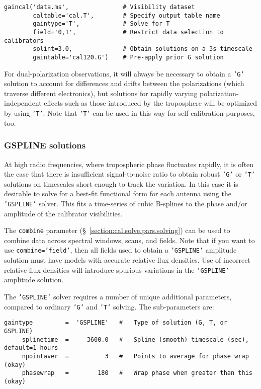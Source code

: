 \small
\begin{verbatim}
gaincal('data.ms',               # Visibility dataset
        caltable='cal.T',        # Specify output table name
        gaintype='T',            # Solve for T
        field='0,1',             # Restrict data selection to calibrators
        solint=3.0,              # Obtain solutions on a 3s timescale
        gaintable='cal120.G')    # Pre-apply prior G solution
\end{verbatim}
\normalsize

For dual-polarization observations, it will always be necessary to
obtain a {\tt 'G'} solution to account for differences and drifts between
the polarizations (which traverse different electronics), but
solutions for rapidly varying polarization-independent effects such as
those introduced by the troposphere will be optimized by using {\tt 'T'}.
Note that {\tt 'T'} can be used in this way for self-calibration purposes,
too.

\subsubsection{GSPLINE solutions}
\label{section:cal.solve.gain.gspline}

At high radio frequencies, where tropospheric phase fluctuates
rapidly, it is often the case that there is insufficient
signal-to-noise ratio to obtain robust {\tt 'G'} or {\tt 'T'}
solutions on timescales short enough to track the 
variation.  In this case it is desirable to solve for a best-fit
functional form for each antenna using the {\tt 'GSPLINE'} solver.  
This fits a time-series of cubic B-splines to the phase and/or
amplitude of the calibrator visibilities.  

The {\tt combine} parameter (\S~\ref{section:cal.solve.pars.solving}) 
can be used to combine data across spectral windows, scans, and
fields.  Note that if you want to use {\tt combine='field'},
then all fields used to obtain a {\tt 'GSPLINE'} amplitude solution must have
models with accurate relative flux densities.  Use of incorrect
relative flux densities will introduce spurious variations in the
{\tt 'GSPLINE'} amplitude solution.

The {\tt 'GSPLINE'} solver requires a number of unique additional parameters,
compared to ordinary {\tt 'G'} and {\tt 'T'} solving.  The sub-parameters are:
\small
\begin{verbatim}
gaintype         =  'GSPLINE'   #   Type of solution (G, T, or GSPLINE)
     splinetime  =     3600.0   #   Spline (smooth) timescale (sec), default=1 hours
     npointaver  =          3   #   Points to average for phase wrap (okay)
     phasewrap   =        180   #   Wrap phase when greater than this (okay)
\end{verbatim}
\normalsize

